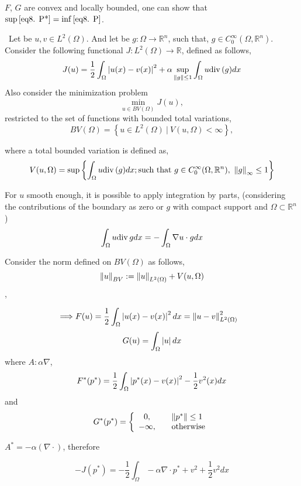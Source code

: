 $F$, $G$ are convex and locally bounded, one can show that 
$\sup\eqref{eq8. P*}=\inf\eqref{eq8. P}$.
\begin{example}
\	
Let be $u, v \in L^2(\Omega)$. And let be $g: \Omega\rightarrow \mathbb{R}^n$, such that, $g\in C_0^\infty(\Omega, \mathbb{R}^n)$. Consider the following functional $J: L^2(\Omega) \rightarrow \mathbb{R}$, defined as follows,
	\begin{equation*}
		J(u)=\frac{1}{2} \int_{\Omega}\left|u(x)-v(x)\right|^2+\alpha \sup_{\left\lVert g\right\rVert\leq 1} \int_{\Omega} u \mathrm{div\,} (g) dx
	\end{equation*}
	Also consider the minimization problem \[\min_{u\in BV(\Omega)} J(u),\] 
	restricted to the set of functions with bounded total variations,
	\[BV(\Omega)=\left\lbrace u\in L^2(\Omega) \ | \ V(u, \Omega) < \infty\right\rbrace,\]
	
	where a total bounded variation is defined as,
	\begin{equation*}
		V(u, \Omega)=\sup\left\lbrace 
		 \int_{\Omega} u \mathrm{div\,} (g) dx;  \text{such that} \ g \in C_0^\infty (\Omega, \mathbb{R}^n), \  \left\lVert g\right\rVert_\infty \leq 1
		\right\rbrace
	\end{equation*}

	 \begin{remark}
	 For $u$ smooth enough, it is possible to apply integration by parts, (considering the contributions of the boundary as zero or $g$ with compact support and $\Omega\subset \mathbb{R}^n$) 
		\[
		\int_{\Omega} u \mathrm{div\,} g dx = -\int_{\Omega} \nabla u \cdot g dx 
		\]
	 \end{remark}

	Consider the norm defined on $BV(\Omega)$ as follows,	
		\[\left\lVert u\right\rVert_{BV}:= \left\lVert u\right\rVert_{L^2(\Omega)}+V(u, \Omega)\],
	
	\begin{align*}
		\implies & F(u)=\frac{1}{2}\int_{\Omega} \left|u(x)-v(x)\right|^2 dx = \left\lVert u-v\right\rVert_{L^2(\Omega)}^2
	\end{align*}
	\[G(u)=\int_{\Omega} \left|u\right|dx\]
	 where $A: \alpha \nabla$,
	\begin{align*}
		F^*(p^*)=\frac{1}{2} \int_{\Omega}\left|p^*(x)-v(x)\right| ^2 -\frac{1}{2} v^2(x) dx
	\end{align*}
	and 
	\[G^*(p^*) =\left\lbrace 
	\begin{array}{cl}
		0, &\quad \left\lVert p^*\right\rVert \leq 1 \\
	-\infty, &\quad \text{otherwise}
	\end{array}
	\right. \]
	
	$A^*=-\alpha (\nabla\cdot)$, therefore
	
	\[-J(p^*)=-\frac{1}{2} \int_{\Omega} -\alpha \nabla\cdot p^* + v^2+ \frac{1}{2} v^2 dx\]
\end{example}

